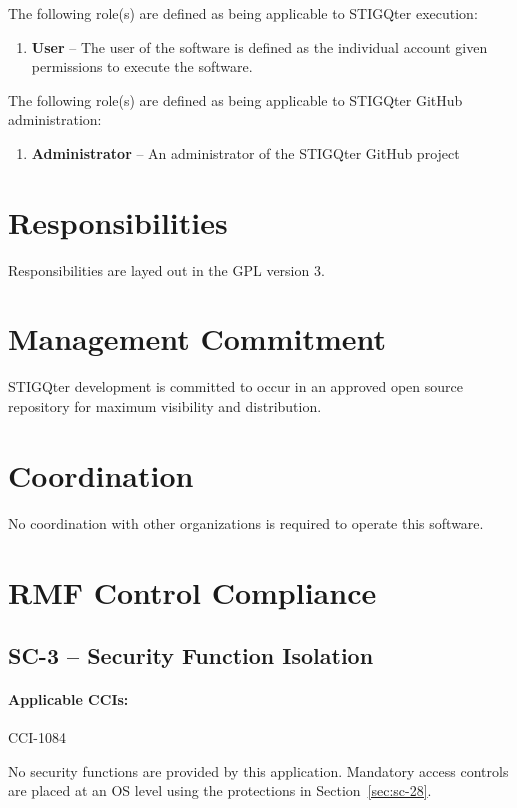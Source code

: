 \documentclass[letterpaper, 10pt, twoside]{article}
\begin{document}
The following role(s) are defined as being applicable to STIGQter execution:
\begin{enumerate}
	\item \textbf{User} -- The user of the software is defined as the individual account given permissions to execute the software.
\end{enumerate}

The following role(s) are defined as being applicable to STIGQter GitHub administration:
\begin{enumerate}
	\item \textbf{Administrator} -- An administrator of the STIGQter GitHub project
\end{enumerate}

\section{Responsibilities}
\label{sec:responsibilities}

Responsibilities are layed out in the GPL version 3.

\section{Management Commitment}

STIGQter development is committed to occur in an approved open source repository for maximum visibility and distribution.

\section{Coordination}

No coordination with other organizations is required to operate this software.

\section{RMF Control Compliance}

\subsection{SC-3 -- Security Function Isolation}

\paragraph{Applicable CCIs:} CCI-1084

No security functions are provided by this application. Mandatory access controls are placed at an OS level using the protections in Section~\ref{sec:sc-28}.
\end{document}
